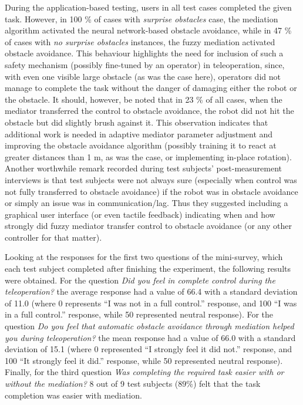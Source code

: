 During the application-based testing, users in all test cases completed the given task. However, in 100 \% of cases with \emph{surprise obstacles} case, the mediation algorithm activated the neural network-based obstacle avoidance, while in 47 \% of cases with \emph{no surprise obstacles} instances, the fuzzy mediation activated obstacle avoidance. This behaviour highlights the need for inclusion of such a safety mechanism (possibly fine-tuned by an operator) in teleoperation, since, with even one visible large obstacle (as was the case here), operators did not manage to complete the task without the danger of damaging either the robot or the obstacle. It should, however, be noted that in 23 \% of all cases, when the mediator transferred the control to obstacle avoidance, the robot did not hit the obstacle but did slightly brush against it. This observation indicates that additional work is needed in adaptive mediator parameter adjustment and improving the obstacle avoidance algorithm (possibly training it to react at greater distances than 1 m, as was the case, or implementing in-place rotation). Another worthwhile remark recorded during test subjects' post-measurement interviews is that test subjects were not always sure (especially when control was not fully transferred to obstacle avoidance) if the robot was in obstacle avoidance or simply an issue was in communication/lag. Thus they suggested including a graphical user interface (or even tactile feedback) indicating when and how strongly did fuzzy mediator transfer control to obstacle avoidance (or any other controller for that matter).

Looking at the responses for the first two questions of the mini-survey, which each test subject completed after finishing the experiment, the following results were obtained. For the question \emph{Did you feel in complete control during the teleoperation?} the average response had a value of 66.4 with a standard deviation of 11.0 (where 0 represents ``I was not in a full control.'' response, and 100 ``I was in a full control.'' response, while 50 represented neutral response). For the question \emph{Do you feel that automatic obstacle avoidance through mediation helped you during teleoperation?} the mean response had a value of 66.0 with a standard deviation of 15.1 (where 0 represented ``I strongly feel it did not.'' response, and 100 ``It strongly feel it did.'' response, while 50 represented neutral response). Finally, for the third question \emph{Was completing the required task easier with or without the mediation?} 8 out of 9 test subjects ($89\%$) felt that the task completion was easier with mediation.

